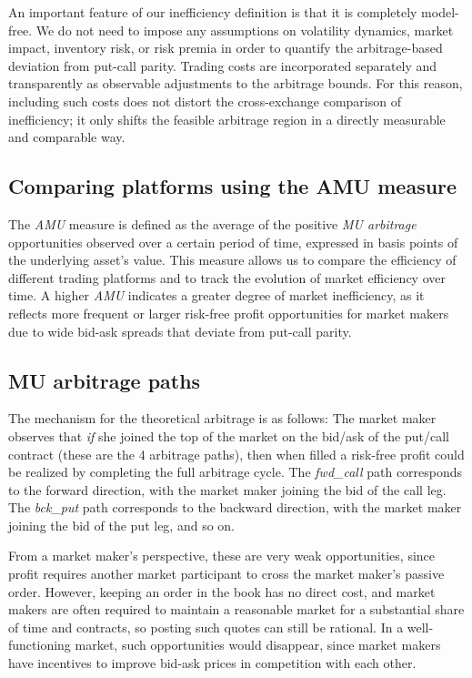 \documentclass[12pt]{article}
\begin{document}
An important feature of our inefficiency definition is that it is completely model-free. We do not need to impose any assumptions on volatility dynamics, market impact, inventory risk, or risk premia in order to quantify the arbitrage-based deviation from put-call parity. Trading costs are incorporated separately and transparently as observable adjustments to the arbitrage bounds. For this reason, including such costs does not distort the cross-exchange comparison of inefficiency; it only shifts the feasible arbitrage region in a directly measurable and comparable way.

\subsection{Comparing platforms using the AMU measure}

The \textit{AMU} measure is defined as the average of the positive \textit{MU arbitrage} opportunities observed over a certain period of time, expressed in basis points of the underlying asset's value. This measure allows us to compare the efficiency of different trading platforms and to track the evolution of market efficiency over time. A higher \textit{AMU} indicates a greater degree of market inefficiency, as it reflects more frequent or larger risk-free profit opportunities for market makers due to wide bid-ask spreads that deviate from put-call parity.

\subsection{MU arbitrage paths}

The mechanism for the theoretical arbitrage is as follows: The market maker observes that \textit{if} she joined the top of the market on the bid/ask of the put/call contract (these are the 4 arbitrage paths), then when filled a risk-free profit could be realized by completing the full arbitrage cycle. The \textit{fwd\_call} path corresponds to the forward direction, with the market maker joining the bid of the call leg. The \textit{bck\_put} path corresponds to the backward direction, with the market maker joining the bid of the put leg, and so on.

From a market maker's perspective, these are very weak opportunities, since profit requires another market participant to cross the market maker's passive order. However, keeping an order in the book has no direct cost, and market makers are often required to maintain a reasonable market for a substantial share of time and contracts, so posting such quotes can still be rational. In a well-functioning market, such opportunities would disappear, since market makers have incentives to improve bid-ask prices in competition with each other.
\end{document}
